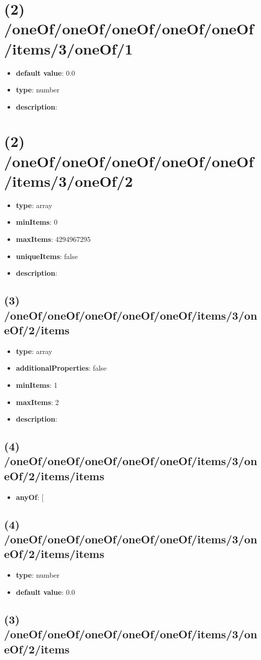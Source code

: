 \section{(2) /oneOf/oneOf/oneOf/oneOf/oneOf/items/3/oneOf/1}
\begin{itemize}[leftmargin=2em]\item {\bf default value}: 0.0
\item {\bf type}: number
\item {\bf description}: 
\end{itemize}\section{(2) /oneOf/oneOf/oneOf/oneOf/oneOf/items/3/oneOf/2}
\begin{itemize}[leftmargin=2em]\item {\bf type}: array
\item {\bf minItems}: 0
\item {\bf maxItems}: 4294967295
\item {\bf uniqueItems}: false
\item {\bf description}: 
\end{itemize}\subsection{(3) /oneOf/oneOf/oneOf/oneOf/oneOf/items/3/oneOf/2/items}
\begin{itemize}[leftmargin=3em]\item {\bf type}: array
\item {\bf additionalProperties}: false
\item {\bf minItems}: 1
\item {\bf maxItems}: 2
\item {\bf description}: 
\end{itemize}\subsection{(4) /oneOf/oneOf/oneOf/oneOf/oneOf/items/3/oneOf/2/items/items}
\begin{itemize}[leftmargin=4em]\item {\bf anyOf}: [\end{itemize}\subsection{(4) /oneOf/oneOf/oneOf/oneOf/oneOf/items/3/oneOf/2/items/items}
\begin{itemize}[leftmargin=4em]\item {\bf type}: number\item {\bf default value}: 0.0
\end{itemize}\subsection{(3) /oneOf/oneOf/oneOf/oneOf/oneOf/items/3/oneOf/2/items}
